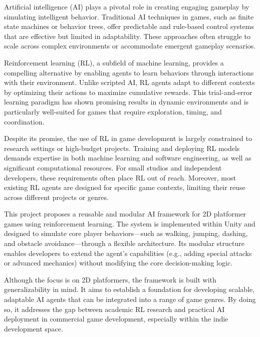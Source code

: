 \documentclass[12pt,oneside,openright,a4paper]{cpe-english-project}
\begin{document}
Artificial intelligence (AI) plays a pivotal role in creating engaging gameplay by simulating intelligent behavior. Traditional AI techniques in games, such as finite state machines or behavior trees, offer predictable and rule-based control systems that are effective but limited in adaptability. These approaches often struggle to scale across complex environments or accommodate emergent gameplay scenarios.\par

Reinforcement learning (RL), a subfield of machine learning, provides a compelling alternative by enabling agents to learn behaviors through interactions with their environment. Unlike scripted AI, RL agents adapt to different contexts by optimizing their actions to maximize cumulative rewards. This trial-and-error learning paradigm has shown promising results in dynamic environments and is particularly well-suited for games that require exploration, timing, and coordination.\par

Despite its promise, the use of RL in game development is largely constrained to research settings or high-budget projects. Training and deploying RL models demands expertise in both machine learning and software engineering, as well as significant computational resources. For small studios and independent developers, these requirements often place RL out of reach. Moreover, most existing RL agents are designed for specific game contexts, limiting their reuse across different projects or genres.\par

This project proposes a reusable and modular AI framework for 2D platformer games using reinforcement learning. The system is implemented within Unity and designed to simulate core player behaviors—such as walking, jumping, dashing, and obstacle avoidance—through a flexible architecture. Its modular structure enables developers to extend the agent’s capabilities (e.g., adding special attacks or advanced mechanics) without modifying the core decision-making logic.\par

Although the focus is on 2D platformers, the framework is built with generalizability in mind. It aims to establish a foundation for developing scalable, adaptable AI agents that can be integrated into a range of game genres. By doing so, it addresses the gap between academic RL research and practical AI deployment in commercial game development, especially within the indie development space.\par
\end{document}
